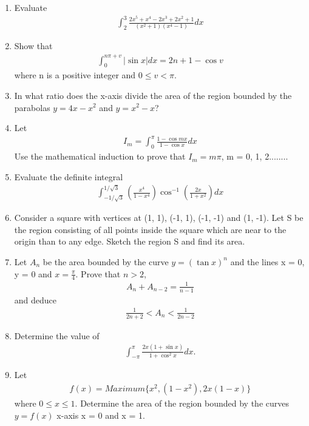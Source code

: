 \begin{enumerate}[label=\arabic*.,ref=\thesubsection.\theenumi]
\item Evaluate
\begin{align*}
\int_{2}^{3}\frac{2x^5 + x^4 - 2x^3 + 2x^2 + 1}{(x^2 + 1)(x^4 - 1)}dx
\end{align*}

\item Show that
\begin{align*}
\int_{0}^{n\pi + v}|\sin x|dx = 2n + 1 - \cos v
\end{align*}
where n is a positive integer and $0 \leq v < \pi$.

\item In what ratio does the x-axis divide the area of the region bounded by the parabolas $y = 4x - x^2$ and $y = x^2 - x$?

\item Let
\begin{align*}
I_m = \int_{0}^{\pi}\frac{1 - \cos mx}{1 - \cos x}dx
\end{align*}
Use the mathematical induction to prove that $I_m = m\pi$, m = 0, 1, 2........

\item Evaluate the definite integral
\begin{align*}
\int_{-1/\sqrt{3}}^{1/\sqrt{3}}\left(\frac{x^4}{1 - x^4}\right)\cos^{-1}\left(\frac{2x}{1 + x^2}\right) dx
\end{align*}

\item Consider a square with vertices at (1, 1), (-1, 1), (-1, -1) and (1, -1). Let S be the region consisting of all points inside the square which are near to the origin than to any edge. Sketch the region S and find its area.

\item Let $A_n$ be the area bounded by the curve $y = (\tan x)^n$ and the lines x = 0, y = 0 and $x = \frac{\pi}{4}$. Prove that $n > 2$,
\begin{align*}
A_n + A_{n-2} = \frac{1}{n - 1}
\end{align*}
and deduce
\begin{align*}
\frac{1}{2n + 2} < A_n < \frac{1}{2n - 2}
\end{align*}

\item Determine the value of
\begin{align*}
\int_{-\pi}^{\pi}\frac{2x(1 + \sin x)}{1 + \cos^{2}x}dx.
\end{align*}

\item Let 
\begin{align*}
f(x) = Maximum\{x^2, (1 - x^2), 2x(1 - x)\}
\end{align*}
where $0 \leq x \leq 1$. Determine the area of the region bounded by the curves $y = f(x)$ x-axis x = 0 and x = 1.


\end{enumerate}
